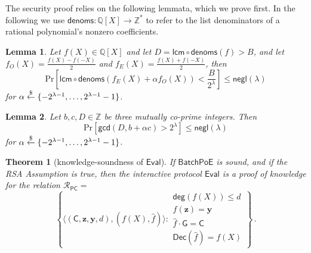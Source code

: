 \documentclass[10pt,conference]{IEEEtran}
\theoremstyle{Definition}
\newtheorem{theorem}{Theorem}
\newtheorem{lemma}{Lemma}
\begin{document}
The security proof relies on the following lemmata, which we prove first. In the following we use $\mathsf{denoms} : \mathbb{Q}[X] \rightarrow \mathbb{Z}^*$ to refer to the list denominators of a rational polynomial's nonzero coefficients.

\begin{lemma}
Let $f(X) \in \mathbb{Q}[X]$ and let $D = \mathsf{lcm} \circ \mathsf{denoms}(f) > B$, and let $f_O(X) = \frac{f(X) - f(-X)}{2}$ and $f_E(X) = \frac{f(X) + f(-X)}{2}$, then
$$ \mathrm{Pr}[\mathsf{lcm} \circ \mathsf{denoms} (f_E(X) + \alpha f_O(X)) < \frac{B}{2^\lambda}] \leq \mathsf{negl}(\lambda) $$
for $\alpha \overset{\$}{\gets} \{-2^{\lambda-1}, \ldots, 2^{\lambda - 1} - 1 \}$.
\end{lemma}

\begin{lemma}
Let $b, c, D \in \mathbb{Z}$ be three mutually co-prime integers. Then
$$ \mathrm{Pr}[\mathsf{gcd}(D, b + \alpha c) > 2^\lambda] \leq \mathsf{negl}(\lambda) $$
for $\alpha \overset{\$}{\gets} \{-2^{\lambda-1}, \ldots, 2^{\lambda - 1} - 1 \}$.
\end{lemma}

\begin{theorem}[knowledge-soundness of $\mathsf{Eval}$]
If $\mathsf{BatchPoE}$ is sound, and if the RSA Assumption is true, then the interactive protocol $\mathsf{Eval}$ is a proof of knowledge for the relation $\mathcal{R}_{\mathsf{PC}} =$
$$ \left\{ \langle (\mathsf{C}, \mathbf{z}, \mathbf{y}, d), (f(X), \hat{f})\rangle : \begin{array}{l}
\mathsf{deg}(f(X)) \leq d \\
f(\mathbf{z}) = \mathbf{y} \\
\hat{f} \cdot \mathsf{G} = \mathsf{C} \\
\mathsf{Dec}(\hat{f}) = f(X)
\end{array} \right\} \, .$$
\end{theorem}
\end{document}
